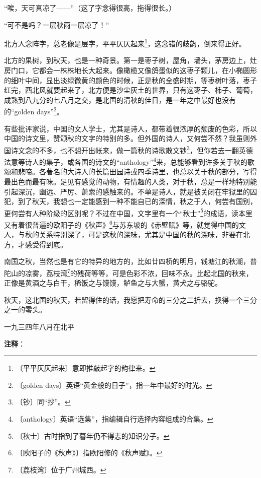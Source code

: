 \documentclass[12pt,UTF-8,openany]{ctexbook}
\begin{document}
\begin{large}
    “唉，天可真凉了——”（这了字念得很高，拖得很长。）
    
    “可不是吗？一层秋雨一层凉了！”
    
    北方人念阵字，总老像是层字，平平仄仄起来\footnote{〔平平仄仄起来〕意即推敲起字的韵律来。}，这念错的歧韵，倒来得正好。
    
    北方的果树，到秋天，也是一种奇景。第一是枣子树，屋角，墙头，茅房边上，灶房门口，它都会一株株地长大起来。像橄榄又像鸽蛋似的这枣子颗儿，在小椭圆形的细叶中间，显出淡绿微黄的颜色的时候，正是秋的全盛时期，等枣树叶落，枣子红完，西北风就要起来了，北方便是沙尘灰土的世界，只有这枣子、柿子、葡萄，成熟到八九分的七八月之交，是北国的清秋的佳日，是一年之中最好也没有的“golden days”\footnote{〔golden days〕英语“黄金般的日子”，指一年中最好的时光。}。
    
    有些批评家说，中国的文人学士，尤其是诗人，都带着很浓厚的颓废的色彩，所以中国的诗文里，赞颂秋的文字的特别的多。但外国的诗人，又何尝不然？我虽则外国诗文念的不多，也不想开出帐来，做一篇秋的诗歌散文钞\footnote{〔钞〕同“抄”。}，但你若去一翻英德法意等诗人的集子，或各国的诗文的“anthology”\footnote{〔anthology〕英语“选集”，指编辑自行选择内容组成的合集。}来，总能够看到许多关于秋的歌颂和悲啼。各著名的大诗人的长篇田园诗或四季诗里，也总以关于秋的部分，写得最出色而最有味。足见有感觉的动物，有情趣的人类，对于秋，总是一样地特别能引起深沉，幽远、严厉、萧索的感触来的。不单是诗人，就是被关闭在牢狱里的囚犯，到了秋天，我想也一定能感到一种不能自已的深情，秋之于人，何尝有国别，更何尝有人种阶级的区别呢？不过在中国，文字里有一个“秋士”\footnote{〔秋士〕古时指到了暮年仍不得志的知识分子。}的成语，读本里又有着很普遍的欧阳子的《秋声》\footnote{〔欧阳子的《秋声》〕指欧阳修的《秋声赋》。}与苏东坡的《赤壁赋》等，就觉得中国的文人，与秋的关系特别深了，可是这秋的深味，尤其是中国的秋的深味，非要在北方，才感受得到底。
    
    南国之秋，当然也是有它的特异的地方的，比如廿四桥的明月，钱塘江的秋潮，普陀山的凉雾，荔枝湾\footnote{〔荔枝湾〕位于广州城西。}的残荷等等，可是色彩不浓，回味不永。比起北国的秋来，正像是黄酒之与白干，稀饭之与馍馍，鲈鱼之与大蟹，黄犬之与骆驼。
    
    秋天，这北国的秋天，若留得住的话，我愿把寿命的三分之二折去，换得一个三分之一的零头。
    
    \hfill 一九三四年八月在北平
    
\end{large}


\newpage

\textbf{注释}：

\vspace{-1em}
\end{document}
